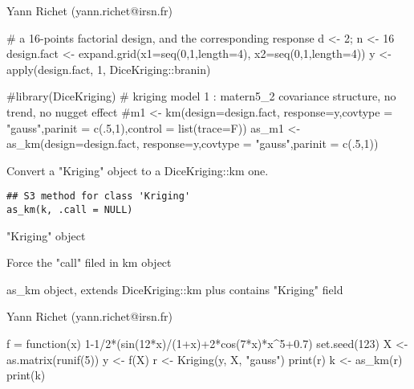 \documentclass[letterpaper]{book}
\begin{document}
%
\begin{Author}\relax
Yann Richet (yann.richet@irsn.fr)
\end{Author}
%
\begin{Examples}
\begin{ExampleCode}
# a 16-points factorial design, and the corresponding response
d <- 2; n <- 16
design.fact <- expand.grid(x1=seq(0,1,length=4), x2=seq(0,1,length=4))
y <- apply(design.fact, 1, DiceKriging::branin) 

#library(DiceKriging)
# kriging model 1 : matern5_2 covariance structure, no trend, no nugget effect
#m1 <- km(design=design.fact, response=y,covtype = "gauss",parinit = c(.5,1),control = list(trace=F))
as_m1 <- as_km(design=design.fact, response=y,covtype = "gauss",parinit = c(.5,1))
\end{ExampleCode}
\end{Examples}
%
\begin{Description}\relax
Convert a "Kriging" object to a DiceKriging::km one.
\end{Description}
%
\begin{Usage}
\begin{verbatim}
## S3 method for class 'Kriging'
as_km(k, .call = NULL)
\end{verbatim}
\end{Usage}
%
\begin{Arguments}
\begin{ldescription}
\item[\code{k}] "Kriging" object

\item[\code{.call}] Force the "call" filed in km object
\end{ldescription}
\end{Arguments}
%
\begin{Value}
as\_km object, extends DiceKriging::km plus contains "Kriging" field
\end{Value}
%
\begin{Author}\relax
Yann Richet (yann.richet@irsn.fr)
\end{Author}
%
\begin{Examples}
\begin{ExampleCode}
f = function(x) 1-1/2*(sin(12*x)/(1+x)+2*cos(7*x)*x^5+0.7)
set.seed(123)
X <- as.matrix(runif(5))
y <- f(X)
r <- Kriging(y, X, "gauss")
print(r)
k <- as_km(r)
print(k)
\end{ExampleCode}
\end{Examples}
\end{document}

